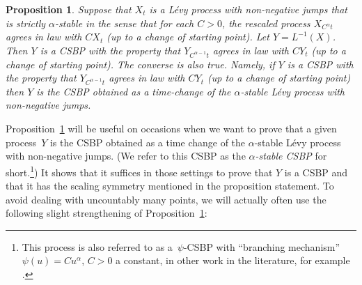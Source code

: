 \documentclass[10pt]{amsart}
\theoremstyle{plain}
\numberwithin{theorem}{section}
\newtheorem{proposition}[theorem]{Proposition}
\theoremstyle{definition}
\begin{document}
\begin{proposition}
\label{prop::stablecsbp}
Suppose that $X_t$ is a Lévy process with non-negative jumps that is strictly \emph{$\alpha$-stable} in the sense that for each $C>0$, the rescaled process $X_{C^\alpha t}$ agrees in law with $C X_t$ (up to a change of starting point). Let $Y = L^{-1}(X)$. Then $Y$ is a CSBP with the property that $Y_{C^{\alpha-1} t}$ agrees in law with $C Y_t$ (up to a change of starting point). The converse is also true. Namely, if $Y$ is a CSBP with the property that $Y_{C^{\alpha-1} t}$ agrees in law with $C Y_t$ (up to a change of starting point) then $Y$ is the CSBP obtained as a time-change of the $\alpha$-stable Lévy process with non-negative jumps.
\end{proposition}

Proposition~\ref{prop::stablecsbp} will be useful on occasions when we want to prove that a given process~$Y$ is the CSBP obtained as a time change of the $\alpha$-stable Lévy process with non-negative jumps. (We refer to this CSBP as the \emph{$\alpha$-stable CSBP} for short.\footnote{This process is also referred to as a~$\psi$-CSBP with ``branching mechanism'' $\psi(u) = C u^\alpha$, $C > 0$ a constant, in other work in the literature, for example \cite{dlg2002trees_levy}.}) It shows that it suffices in those settings to prove that $Y$ is a CSBP and that it has the scaling symmetry mentioned in the proposition statement. To avoid dealing with uncountably many points, we will actually often use the following slight strengthening of Proposition~\ref{prop::stablecsbp}:
\end{document}

